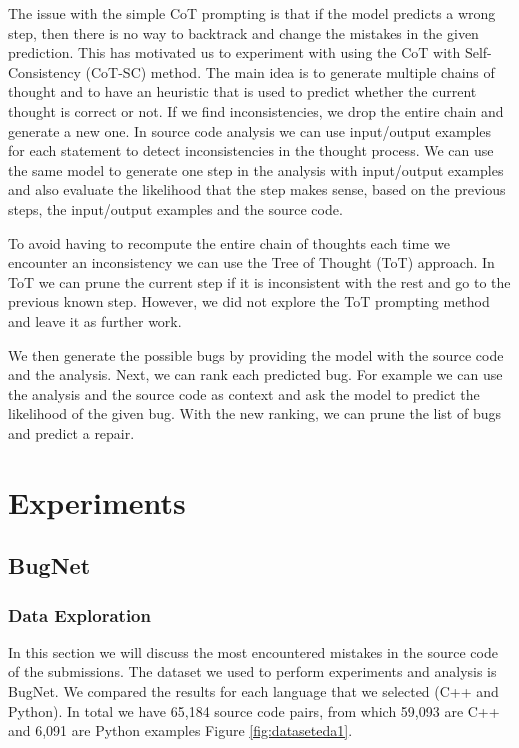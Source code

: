 \documentclass[12pt,a4paper]{report}
\begin{document}
The issue with the simple CoT prompting is that if the model predicts a wrong step, then there is no way to backtrack and change the mistakes in the given prediction. This has motivated us to experiment with using the CoT with Self-Consistency (CoT-SC) method. The main idea is to generate multiple chains of thought and to have an heuristic that is used to predict whether the current thought is correct or not. If we find inconsistencies, we drop the entire chain and generate a new one. In source code analysis we can use input/output examples for each statement to detect inconsistencies in the thought process. We can use the same model to generate one step in the analysis with input/output examples and also evaluate the likelihood that the step makes sense, based on the previous steps, the input/output examples and the source code.

To avoid having to recompute the entire chain of thoughts each time we encounter an inconsistency we can use the Tree of Thought (ToT) approach. In ToT we can prune the current step if it is inconsistent with the rest and go to the previous known step. However, we did not explore the ToT prompting method and leave it as further work.

We then generate the possible bugs by providing the model with the source code and the analysis. Next, we can rank each predicted bug. For example we can use the analysis and the source code as context and ask the model to predict the likelihood of the given bug. With the new ranking, we can prune the list of bugs and predict a repair.

\chapter{Experiments}

\section{BugNet}

\subsection{Data Exploration}

In this section we will discuss the most encountered mistakes in the source code of the submissions. The dataset we used to perform experiments and analysis is BugNet. We compared the results for each language that we selected (C++ and Python). In total we have 65,184 source code pairs, from which 59,093 are C++ and 6,091 are Python examples Figure \ref{fig:dataseteda1}.
\end{document}
